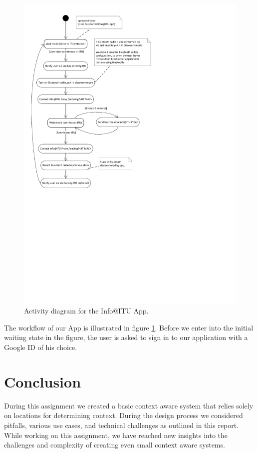 \documentclass{ubicomp2011}
\begin{document}
\begin{figure}[t]
\begin{center}
\includegraphics[width=0.90\columnwidth]{android-app-activity-diagram.pdf}
\end{center}
\caption{Activity diagram for the Info@ITU App.}
\label{fig:android-app-activity-diagram}
\end{figure}

The workflow of our App is illustrated in figure \ref{fig:android-app-activity-diagram}. Before we enter into the initial waiting state in the figure, the user is asked to sign in to our application with a Google ID of his choice.

\section{Conclusion}
During this assignment we created a basic context aware system that relies solely on locations for determining context. During the design process we considered pitfalls, various use cases, and technical challenges as outlined in this report. While working on this assignment, we have reached new insights into the challenges and complexity of creating even small context aware systems.
\end{document}
